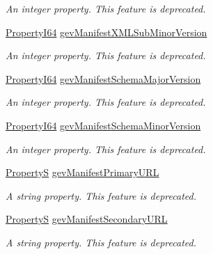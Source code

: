 \begin{DoxyCompactItemize}
\begin{DoxyCompactList}\small\item\em An integer property. This feature is deprecated. \end{DoxyCompactList}\item 
\hyperlink{group___common_interface_ga81749b2696755513663492664a18a893}{Property\+I64} \hyperlink{classmv_i_m_p_a_c_t_1_1acquire_1_1_gen_i_cam_1_1_transport_layer_control_aaf30f52128519238a83f09ca514fd246}{gev\+Manifest\+X\+M\+L\+Sub\+Minor\+Version}
\begin{DoxyCompactList}\small\item\em An integer property. This feature is deprecated. \end{DoxyCompactList}\item 
\hyperlink{group___common_interface_ga81749b2696755513663492664a18a893}{Property\+I64} \hyperlink{classmv_i_m_p_a_c_t_1_1acquire_1_1_gen_i_cam_1_1_transport_layer_control_adb743bf3011dfaf67eee22d4cfdeab6c}{gev\+Manifest\+Schema\+Major\+Version}
\begin{DoxyCompactList}\small\item\em An integer property. This feature is deprecated. \end{DoxyCompactList}\item 
\hyperlink{group___common_interface_ga81749b2696755513663492664a18a893}{Property\+I64} \hyperlink{classmv_i_m_p_a_c_t_1_1acquire_1_1_gen_i_cam_1_1_transport_layer_control_a526c7ffd26f143f3e12500591ce67e14}{gev\+Manifest\+Schema\+Minor\+Version}
\begin{DoxyCompactList}\small\item\em An integer property. This feature is deprecated. \end{DoxyCompactList}\item 
\hyperlink{classmv_i_m_p_a_c_t_1_1acquire_1_1_property_s}{Property\+S} \hyperlink{classmv_i_m_p_a_c_t_1_1acquire_1_1_gen_i_cam_1_1_transport_layer_control_a5f62b8dfe1170a36c3dcef34ea5b4825}{gev\+Manifest\+Primary\+U\+R\+L}
\begin{DoxyCompactList}\small\item\em A string property. This feature is deprecated. \end{DoxyCompactList}\item 
\hyperlink{classmv_i_m_p_a_c_t_1_1acquire_1_1_property_s}{Property\+S} \hyperlink{classmv_i_m_p_a_c_t_1_1acquire_1_1_gen_i_cam_1_1_transport_layer_control_a45861368f934e515023577e0dfa49080}{gev\+Manifest\+Secondary\+U\+R\+L}
\begin{DoxyCompactList}\small\item\em A string property. This feature is deprecated. \end{DoxyCompactList}\item 

\end{DoxyCompactItemize}
